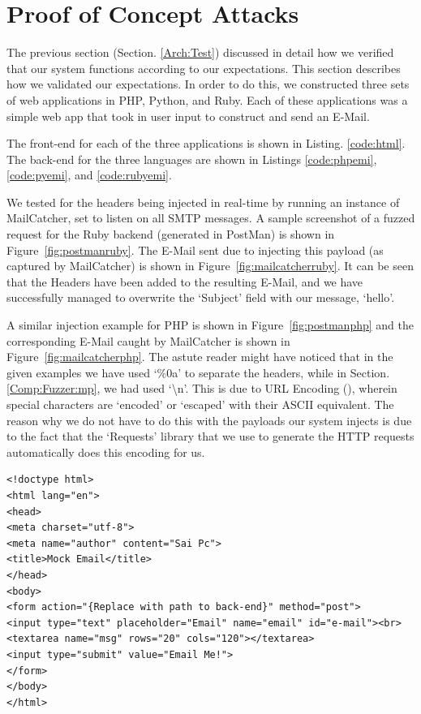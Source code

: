 \section{Proof of Concept Attacks}
The previous section (Section. \ref{Arch:Test}) discussed in detail how we verified that our system functions according to our expectations. This section describes how we validated our expectations. In order to do this, we constructed three sets of web applications in PHP, Python, and Ruby. Each of these applications was a simple web app that took in user input to construct and send an E-Mail.

The front-end for each of the three applications is shown in Listing. \ref{code:html}. The back-end for the three languages are shown in Listings \ref{code:phpemi}, \ref{code:pyemi}, and \ref{code:rubyemi}.

We tested for the headers being injected in real-time by running an instance of MailCatcher, set to listen on all SMTP messages. A sample screenshot of a fuzzed request for the Ruby backend (generated in PostMan) is shown in Figure~\ref{fig:postmanruby}. The E-Mail sent due to injecting this payload (as captured by MailCatcher) is shown in Figure~\ref{fig:mailcatcherruby}. It can be seen that the Headers have been added to the resulting E-Mail, and we have successfully managed to overwrite the `Subject' field with our message, `hello'.

A similar injection example for PHP is shown in Figure~\ref{fig:postmanphp} and the corresponding E-Mail caught by MailCatcher is shown in Figure~\ref{fig:mailcatcherphp}. The astute reader might have noticed that in the given examples we have used `\%0a' to separate the headers, while in Section. \ref{Comp:Fuzzer:mp}, we had used `\textbackslash{}n'. This is due to URL Encoding (\cite{rfc1738}), wherein special characters are `encoded' or `escaped' with their ASCII equivalent.
The reason why we do not have to do this with the payloads our system injects is due to the fact that the `Requests' library that we use to generate the HTTP requests automatically does this encoding for us.

\begin{lstlisting}
<!doctype html>
<html lang="en">
<head>
<meta charset="utf-8">
<meta name="author" content="Sai Pc">
<title>Mock Email</title>
</head>
<body>
<form action="{Replace with path to back-end}" method="post">
<input type="text" placeholder="Email" name="email" id="e-mail"><br>
<textarea name="msg" rows="20" cols="120"></textarea>
<input type="submit" value="Email Me!">
</form>
</body>
</html>
\end{lstlisting}

